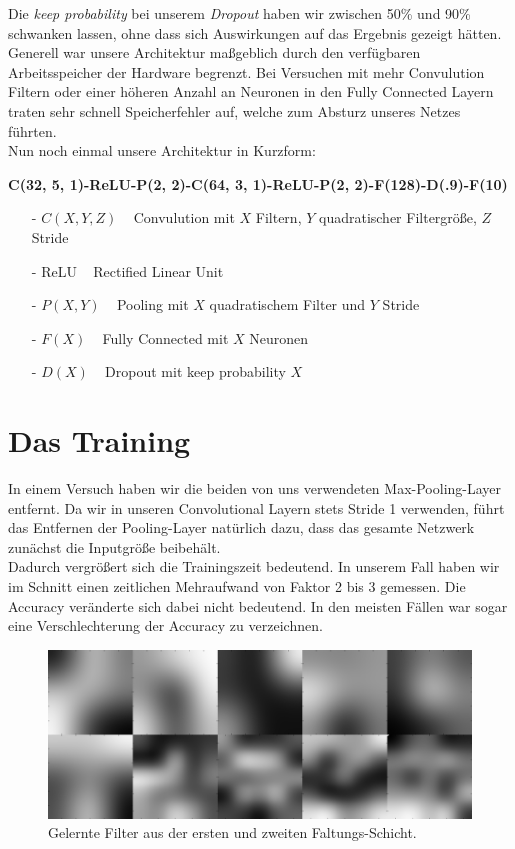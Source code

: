 \documentclass[10pt,journal,compsoc]{IEEEtran}
\begin{document}
Die \emph{keep probability} bei unserem \emph{Dropout} haben wir zwischen 50\% und 90\% schwanken lassen, ohne dass sich Auswirkungen auf das Ergebnis gezeigt hätten.
Generell war unsere Architektur maßgeblich durch den verfügbaren Arbeitsspeicher der Hardware begrenzt. Bei Versuchen mit mehr Convulution Filtern oder einer höheren Anzahl an Neuronen in den Fully Connected Layern traten sehr schnell Speicherfehler auf, welche zum Absturz unseres Netzes führten.\\

\noindent Nun noch einmal unsere Architektur in Kurzform:

\begin{scriptsize}
\textbf{
C(32, 5, 1)-ReLU-P(2, 2)-C(64, 3, 1)-ReLU-P(2, 2)-F(128)-D(.9)-F(10)}
\end{scriptsize}

\begin{itemize}
\item[-] $C(X, Y, Z)$ ~ Convulution mit $X$ Filtern, $Y$ quadratischer Filtergröße, $Z$ Stride
\item[-] ReLU ~ Rectified Linear Unit
\item[-] $P(X, Y)$ ~ Pooling mit $X$ quadratischem Filter und $Y$ Stride
\item[-] $F(X)$ ~ Fully Connected mit $X$ Neuronen
\item[-] $D(X)$ ~ Dropout mit keep probability $X$
\end{itemize}

\section{Das Training}

In einem Versuch haben wir die beiden von uns verwendeten Max-Pooling-Layer entfernt.
Da wir in unseren Convolutional Layern stets Stride 1 verwenden, führt das Entfernen der Pooling-Layer natürlich dazu, dass das gesamte Netzwerk zunächst die Inputgröße beibehält.\\

\noindent Dadurch vergrößert sich die Trainingszeit bedeutend. In unserem Fall haben wir im Schnitt einen zeitlichen Mehraufwand von Faktor 2 bis 3 gemessen.
Die Accuracy veränderte sich dabei nicht bedeutend. In den meisten Fällen war sogar eine Verschlechterung der Accuracy zu verzeichnen.\\

\begin{figure}[!h]
\centering
\includegraphics[scale=0.25]{learned_conv_filter_from_first_and_second_layer}
\caption{Gelernte Filter aus der ersten und zweiten Faltungs-Schicht.}
\end{figure}
\end{document}
